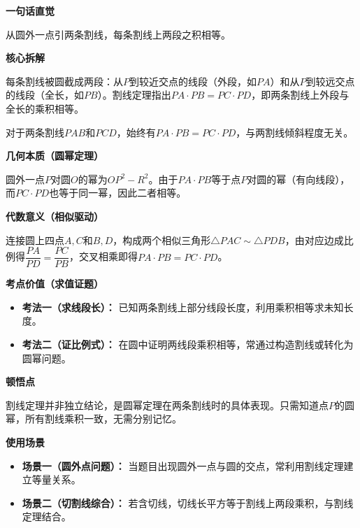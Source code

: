 \begin{explanationbox}
	\textbf{\textcolor{CExplanation}{一句话直觉}}

	从圆外一点引两条割线，每条割线上两段之积相等。

	\medskip
	\textbf{\textcolor{CExplanation}{核心拆解}}
	\begin{description}[style=nextline, leftmargin=2.8em, labelsep=0.5em, itemsep=0.45em]
		\item[\textbf{要点一（割线分段）：}] 每条割线被圆截成两段：从$P$到较近交点的线段（外段，如$PA$）和从$P$到较远交点的线段（全长，如$PB$）。割线定理指出$PA\cdot PB = PC\cdot PD$，即两条割线上外段与全长的乘积相等。
		\item[\textbf{要点二（等积关系）：}] 对于两条割线$PAB$和$PCD$，始终有$PA\cdot PB = PC\cdot PD$，与两割线倾斜程度无关。
	\end{description}

	\medskip
	\textbf{\textcolor{CExplanation}{几何本质（圆幂定理）}}

	圆外一点$P$对圆$O$的幂为$OP^2-R^2$。由于$PA\cdot PB$等于点$P$对圆的幂（有向线段），而$PC\cdot PD$也等于同一幂，因此二者相等。

	\medskip
	\textbf{\textcolor{CExplanation}{代数意义（相似驱动）}}

	连接圆上四点$A,C$和$B,D$，构成两个相似三角形$\triangle PAC \sim \triangle PDB$，由对应边成比例得$\dfrac{PA}{PD} = \dfrac{PC}{PB}$，交叉相乘即得$PA\cdot PB = PC\cdot PD$。

	\medskip
	\textbf{\textcolor{CExplanation}{考点价值（求值证题）}}
	\begin{itemize}[leftmargin=*, itemsep=0.5em, topsep=0.4em]
		\item \textbf{考法一（求线段长）：} 已知两条割线上部分线段长度，利用乘积相等求未知长度。
		\item \textbf{考法二（证比例式）：} 在圆中证明两线段乘积相等，常通过构造割线或转化为圆幂问题。
	\end{itemize}

	\medskip
	\textbf{\textcolor{CExplanation}{顿悟点}}

	割线定理并非独立结论，是圆幂定理在两条割线时的具体表现。只需知道点$P$的圆幂，所有割线乘积一致，无需分别记忆。

	\medskip
	\textbf{\textcolor{CExplanation}{使用场景}}
	\begin{itemize}[leftmargin=*, itemsep=0.5em, topsep=0.4em]
		\item \textbf{场景一（圆外点问题）：} 当题目出现圆外一点与圆的交点，常利用割线定理建立等量关系。
		\item \textbf{场景二（切割线综合）：} 若含切线，切线长平方等于割线上两段乘积，与割线定理结合。
	\end{itemize}
\end{explanationbox}
